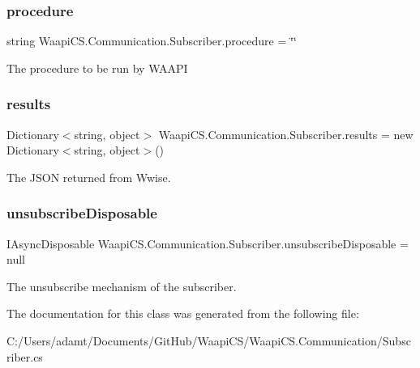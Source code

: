 \subsubsection{\texorpdfstring{procedure}{procedure}}
{\footnotesize\ttfamily string Waapi\+C\+S.\+Communication.\+Subscriber.\+procedure = \char`\"{}\char`\"{}}



The procedure to be run by W\+A\+A\+PI 

\mbox{\label{class_waapi_c_s_1_1_communication_1_1_subscriber_abf320768fcdb6a60c222f6fc4c3b93ba}} 
\subsubsection{\texorpdfstring{results}{results}}
{\footnotesize\ttfamily Dictionary$<$string, object$>$ Waapi\+C\+S.\+Communication.\+Subscriber.\+results = new Dictionary$<$string, object$>$()}



The J\+S\+ON returned from Wwise. 

\mbox{\label{class_waapi_c_s_1_1_communication_1_1_subscriber_abcaebc9074477ea078a0a095042122eb}} 
\subsubsection{\texorpdfstring{unsubscribe\+Disposable}{unsubscribeDisposable}}
{\footnotesize\ttfamily I\+Async\+Disposable Waapi\+C\+S.\+Communication.\+Subscriber.\+unsubscribe\+Disposable = null}



The unsubscribe mechanism of the subscriber. 



The documentation for this class was generated from the following file\+:\begin{DoxyCompactItemize}
\item 
C\+:/\+Users/adamt/\+Documents/\+Git\+Hub/\+Waapi\+C\+S/\+Waapi\+C\+S.\+Communication/Subscriber.\+cs\end{DoxyCompactItemize}
